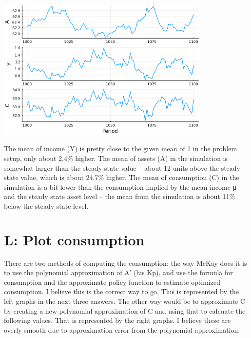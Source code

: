 \documentclass[12pt]{article}
\begin{document}
\includegraphics[width=0.8\textwidth]{problem sets/ps8/K-evolutions.png}

The mean of income (Y) is pretty close to the given mean of 1 in the problem setup,
only about 2.4\% higher.
The mean of assets (A) in the simulation is somewhat larger than the steady state value --
about 12 units above the steady state value, which is about 24.7\% higher.
The mean of consumption (C) in the simulation is a bit lower than the
consumption implied by the mean income μ and the steady state asset level --
the mean from the simulation is about 11\% below the steady state level.








\newpage
\section*{L: Plot consumption}

There are two methods of computing the consumption: the way McKay does it is to use the polynomial approximation of A' (his Kp), and use the formula for consumption and the approximate policy function to estimate optimized consumption. I believe this is the correct way to go. This is represented by the left graphs in the next three answers. The other way would be to approximate C by creating a new polynomial approximation of C and using that to calcuate the following values. That is represented by the right graphs. I believe these are overly smooth due to approximation error from the polynomial approximation.
\end{document}
